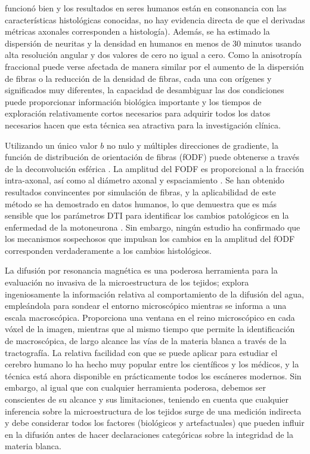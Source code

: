 funcionó bien y los resultados en seres humanos están en consonancia con las características histológicas conocidas, no hay evidencia directa de que el derivadas métricas axonales corresponden a histología). Además, se ha estimado la dispersión de neuritas y la densidad \cite{Jespersen_2007} en humanos en menos de 30 minutos usando alta resolución angular y dos valores de cero no igual a cero. Como la anisotropía fraccional puede verse afectada de manera similar por el aumento de la dispersión de fibras o la reducción de la densidad de fibras, cada una con orígenes y significados muy diferentes, la capacidad de desambiguar las dos condiciones puede proporcionar información biológica importante y los tiempos de exploración relativamente cortos necesarios para adquirir todos los datos necesarios hacen que esta técnica sea atractiva para la investigación clínica.

Utilizando un único valor $b$ no nulo y múltiples direcciones de gradiente, la función de distribución de orientación de fibras (fODF) puede obtenerse a través de la deconvolución esférica \cite{Tournier2004}. La amplitud del FODF es proporcional a la fracción intra-axonal, así como al diámetro axonal y espaciamiento \cite{Raffelt_2012,DellAcqua_2012}. Se han obtenido resultados convincentes por simulación de fibras, y la aplicabilidad de este método se ha demostrado en datos humanos, lo que demuestra que es más sensible que los parámetros DTI para identificar los cambios patológicos en la enfermedad de la motoneurona \cite{Raffelt_2012}. Sin embargo, ningún estudio ha confirmado que los mecanismos sospechosos que impulsan los cambios en la amplitud del fODF corresponden verdaderamente a los cambios histológicos.

La difusión por resonancia magnética es una poderosa herramienta para la evaluación no invasiva de la microestructura de los tejidos; explora ingeniosamente la información relativa al comportamiento de la difusión del agua, empleándola para sondear el entorno microscópico mientras se informa a una escala macroscópica. Proporciona una ventana en el reino microscópico en cada vóxel de la imagen, mientras que al mismo tiempo que permite la identificación de macroscópica, de largo alcance las vías de la materia blanca a través de la tractografía. La relativa facilidad con que se puede aplicar para estudiar el cerebro humano lo ha hecho muy popular entre los científicos y los médicos, y la técnica está ahora disponible en prácticamente todos los escáneres modernos. Sin embargo, al igual que con cualquier herramienta poderosa, debemos ser conscientes de su alcance y sus limitaciones, teniendo en cuenta que cualquier inferencia sobre la microestructura de los tejidos surge de una medición indirecta y debe considerar todos los factores (biológicos y artefactuales) que pueden influir en la difusión antes de hacer declaraciones categóricas sobre la integridad de la materia blanca.
